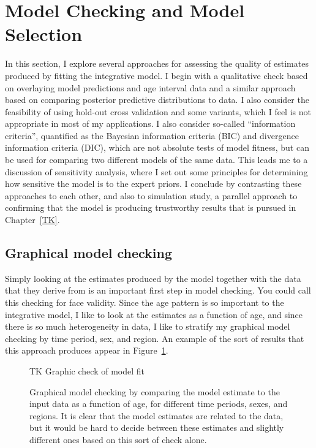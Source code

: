 \section{Model Checking and Model Selection}

In this section, I explore several approaches for assessing the
quality of estimates produced by fitting the integrative model.  I
begin with a qualitative check based on overlaying model predictions
and age interval data and a similar approach based on comparing
posterior predictive distributions to data.  I also consider the
feasibility of using hold-out cross validation and some variants,
which I feel is not appropriate in most of my applications.  I also
consider so-called ``information criteria'', quantified as the
Bayesian information criteria (BIC) and divergence information
criteria (DIC), which are not absolute tests of model fitness, but can
be used for comparing two different models of the same data.  This
leads me to a discussion of sensitivity analysis, where I set out
some principles for determining how sensitive the model is to the expert
priors.  I conclude by contrasting these approaches to each other, and
also to simulation study, a parallel approach to confirming that the
model is producing trustworthy results that is pursued in
Chapter~\ref{TK}.

\subsection{Graphical model checking}
Simply looking at the estimates produced by the model together with
the data that they derive from is an important first step in model
checking.  You could call this checking for face validity.  Since the
age pattern is so important to the integrative model, I like to look
at the estimates as a function of age, and since there is so much
heterogeneity in data, I like to stratify my graphical model checking
by time period, sex, and region.  An example of the sort of results
that this approach produces appear in Figure~\ref{graphical-model-checking}.

\begin{figure}
\begin{center}
TK Graphic check of model fit
\end{center}
\caption{Graphical model checking by comparing the model estimate to
  the input data as a function of age, for different time periods,
  sexes, and regions.  It is clear that the model estimates are
  related to the data, but it would be hard to decide between these
  estimates and slightly different ones based on this sort of check
  alone.}
\label{graphical-model-checking}
\end{figure}

